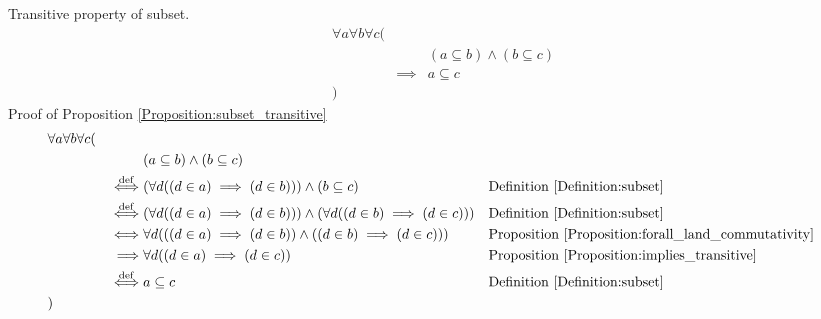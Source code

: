 \begin{prop}
\label{Proposition:subset_transitive}
Transitive property of subset.
\begin{align*}
& \forall a \forall b \forall c ( \\
& & & (a \subseteq b) \land (b \subseteq c) \\
& & \implies & a \subseteq c \\
& )
\end{align*}
Proof of Proposition \ref{Proposition:subset_transitive}
\begin{align*}
& \forall a \forall b \forall c ( \\
& & & (a \subseteq b) \land (b \subseteq c) \\
& & \overset{\operatorname{def}}{\iff} & (\forall d ((d \in a) \implies (d \in b))) \land (b \subseteq c)
& & \text{Definition \ref{Definition:subset}} \\
& & \overset{\operatorname{def}}{\iff} & (\forall d ((d \in a) \implies (d \in b))) \land (\forall d ((d \in b) \implies (d \in c)))
& & \text{Definition \ref{Definition:subset}} \\
& & \iff & \forall d (((d \in a) \implies (d \in b)) \land ((d \in b) \implies (d \in c)))
& & \text{Proposition \ref{Proposition:forall_land_commutativity}} \\
& & \implies & \forall d ((d \in a) \implies (d \in c))
& & \text{Proposition \ref{Proposition:implies_transitive}} \\
& & \overset{\operatorname{def}}{\iff} & a \subseteq c
& & \text{Definition \ref{Definition:subset}} \\
& )
\end{align*}
\end{prop}

